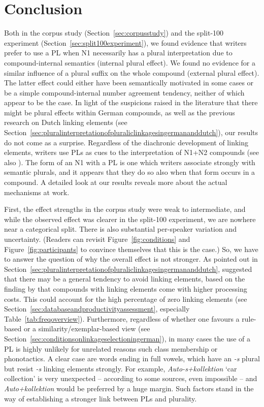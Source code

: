 \section{Conclusion}
\label{sec:conclusion}

Both in the corpus study (Section~\ref{sec:corpusstudy}) and the split-100 experiment (Section~\ref{sec:split100experiment}), we found evidence that writers prefer to use a PL when N1 necessarily has a plural interpretation due to compound-internal semantics (internal plural effect).
We found no evidence for a similar influence of a plural suffix on the whole compound (external plural effect).
The latter effect could either have been semantically motivated in some cases or be a simple compound-internal number agreement tendency, neither of which appear to be the case.
In light of the suspicions raised in the literature that there might be plural effects within German compounds, as well as the previous research on Dutch linking elements (see Section~\ref{sec:pluralinterpretationofpluraliclinkagesingermananddutch}), our results do not come as a surprise.
Regardless of the diachronic development of linking elements, writers use PLs as cues to the interpretation of N1+N2 compounds (see also \citealt[212]{BangaEa2013b}).
The form of an N1 with a PL is one which writers associate strongly with semantic plurals, and it appears that they do so also when that form occurs in a compound.
A detailed look at our results reveals more about the actual mechanisms at work.

First, the effect strengths in the corpus study were weak to intermediate, and while the observed effect was clearer in the split-100 experiment, we are nowhere near a categorical split.
There is also substantial per-speaker variation and uncertainty.
(Readers can revisit Figure~\ref{fig:conditions} and Figure~\ref{fig:participants} to convince themselves that this is the case.)
So, we have to answer the question of why the overall effect is not stronger.
As pointed out in Section~\ref{sec:pluralinterpretationofpluraliclinkagesingermananddutch}, \textcite[45]{BangaEa2013a} suggested that there may be a general tendency to avoid linking elements, based on the finding by \textcite{LibbenEa2002} that compounds with linking elements come with higher processing costs.
This could account for the high percentage of zero linking elements (see Section~\ref{sec:databaseandproductivityassessment}, especially Table~\ref{tab:freqoverview}).
Furthermore, regardless of whether one favours a rule-based or a similarity\slash exemplar-based view (see Section~\ref{sec:conditionsonlinkageselectioningerman}), in many cases the use of a PL is highly unlikely for unrelated reasons such class membership or phonotactics.
A clear case are words ending in full vowels, which have an \textit{-s} plural but resist \textit{-s} linking elements strongly.
For example, \textit{Auto-s+kollektion} `car collection' is very unexpected -- according to some sources, even impossible \citep{Wegener2003,Wegener2005,Fuhrhop1996} -- and \textit{Auto+kollektion} would be preferred by a huge margin.
Such factors stand in the way of establishing a stronger link between PLs and plurality.

